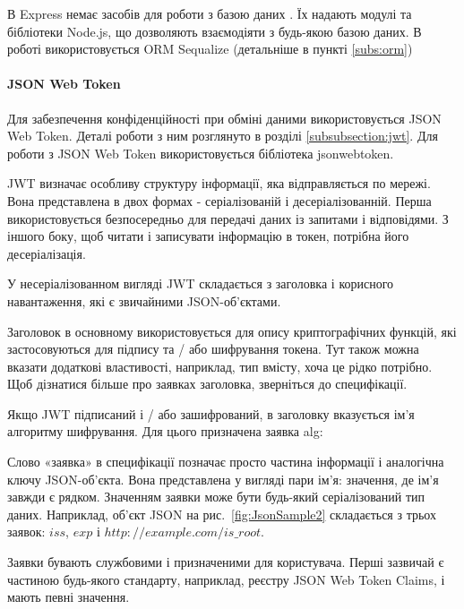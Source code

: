 В Express немає засобів для роботи з базою даних \cite{simon2015nodeexpress}. Їх надають модулі та бібліотеки Node.js, що дозволяють взаємодіяти з будь-якою базою даних. В роботі використовується ORM Sequalize (детальніше в пункті \ref{subs:orm})


\paragraph{JSON Web Token}

Для забезпечення конфіденційності при обміні даними використовується JSON Web Token. Деталі роботи з ним розглянуто в розділі \ref{subsubsection:jwt}. Для роботи з JSON Web Token використовується бібліотека jsonwebtoken.

JWT визначає особливу структуру інформації, яка відправляється по мережі. Вона представлена в двох формах - серіалізованій і десеріалізованній. Перша використовується безпосередньо для передачі даних із запитами і відповідями. З іншого боку, щоб читати і записувати інформацію в токен, потрібна його десеріалізація.

У несеріалізованном вигляді JWT складається з заголовка і корисного навантаження, які є звичайними JSON-об'єктами. 

Заголовок \cite{jose} в основному використовується для опису криптографічних функцій, які застосовуються для підпису та / або шифрування токена. Тут також можна вказати додаткові властивості, наприклад, тип вмісту, хоча це рідко потрібно. Щоб дізнатися більше про заявках заголовка, зверніться до специфікації.

Якщо JWT підписаний і / або зашифрований, в заголовку вказується ім'я алгоритму шифрування. Для цього призначена заявка alg: 


Слово «заявка» в специфікації позначає просто частина інформації і аналогічна ключу JSON-об'єкта. Вона представлена у вигляді пари ім'я: значення, де ім'я завжди є рядком. Значенням заявки може бути будь-який серіалізований тип даних. Наприклад, об'єкт JSON на рис.~\ref{fig:JsonSample2} складається з трьох заявок: $iss$, $exp$ і $http://example.com/is\_root$.


Заявки бувають службовими і призначеними для користувача. Перші зазвичай є частиною будь-якого стандарту, наприклад, реєстру JSON Web Token Claims, і мають певні значення. 

